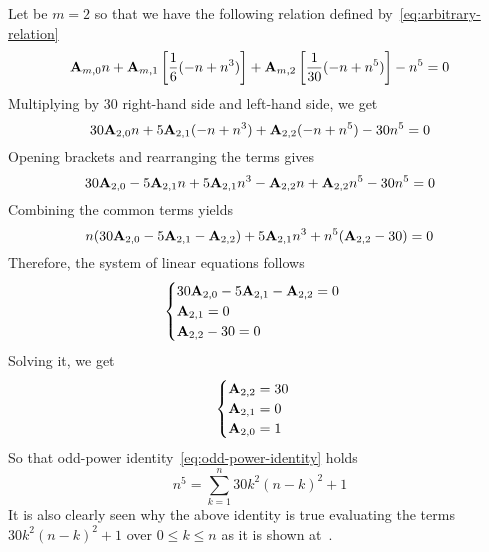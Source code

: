\begin{examp}
    Let be $m=2$ so that we have the following relation defined by~\eqref{eq:arbitrary-relation}
    \begin{equation*}
        {\mathbf{A}} \sb{m,0} n
        + {\mathbf{A}} \sb{m,1} \left[ \frac{1}{6} (-n + n^3) \right]
        + {\mathbf{A}} \sb{m,2} \left[ \frac{1}{30} (-n + n^5) \right] - n^5 = 0
    \end{equation*}
    Multiplying by $30$ right-hand side and left-hand side, we get
    \begin{equation*}
        30 {\mathbf{A}} \sb{2,0} n + 5 {\mathbf{A}} \sb{2,1} (-n + n^3) + {\mathbf{A}} \sb{2,2} (-n + n^5) - 30n^5 = 0
    \end{equation*}
    Opening brackets and rearranging the terms gives
    \begin{equation*}
        30 {\mathbf{A}} \sb{2,0} - 5 {\mathbf{A}} \sb{2,1} n + 5 {\mathbf{A}} \sb{2,1} n^3 - {\mathbf{A}} \sb{2,2} n + {\mathbf{A}} \sb{2,2} n^5 - 30n^5 = 0
    \end{equation*}
    Combining the common terms yields
    \begin{equation*}
        n (30 {\mathbf{A}} \sb{2,0} - 5 {\mathbf{A}} \sb{2,1} - {\mathbf{A}} \sb{2,2}) + 5 {\mathbf{A}} \sb{2,1} n^3 + n^5 ({\mathbf{A}} \sb{2,2} - 30) = 0
    \end{equation*}
    Therefore, the system of linear equations follows
    \begin{equation*}
        \begin{cases}
            30 {\mathbf{A}} \sb{2,0} - 5 {\mathbf{A}} \sb{2,1} - {\mathbf{A}} \sb{2,2} = 0 \\
            {\mathbf{A}} \sb{2,1} = 0 \\
            {\mathbf{A}} \sb{2,2} - 30 = 0
        \end{cases}
    \end{equation*}
    Solving it, we get
    \begin{equation*}
        \begin{cases}
            {\mathbf{A}} \sb{2,2} = 30 \\
            {\mathbf{A}} \sb{2,1} = 0 \\
            {\mathbf{A}} \sb{2,0} = 1
        \end{cases}
    \end{equation*}
    So that odd-power identity~\eqref{eq:odd-power-identity} holds
    \begin{equation*}
        n^5 = \sum_{k=1}^{n} 30k^2(n-k)^2 + 1
    \end{equation*}
    It is also clearly seen
    why the above identity is true evaluating the terms $30k^2(n-k)^2 + 1$ over $0 \leq k \leq n$ as
    it is shown at~\cite{kolosov2018fifth}.
\end{examp}